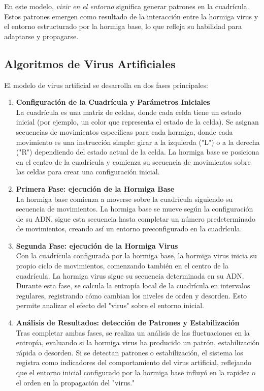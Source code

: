 \documentclass[11pt,letterpaper]{article}
\begin{document}
\begin{multicols}{2}
En este modelo, \textit{vivir en el entorno} significa generar patrones en la cuadrícula. Estos patrones emergen como resultado de la interacción entre la hormiga virus y el entorno estructurado por la hormiga base, lo que refleja su habilidad para adaptarse y propagarse.

\subsection{Algoritmos de Virus Artificiales}
El modelo de virus artificial se desarrolla en dos fases principales:

\begin{enumerate}
    \item \textbf{Configuración de la Cuadrícula y Parámetros Iniciales} \\
    La cuadrícula es una matriz de celdas, donde cada celda tiene un estado inicial (por ejemplo, un color que representa el estado de la celda). Se asignan secuencias de movimientos específicas para cada hormiga, donde cada movimiento es una instrucción simple: girar a la izquierda ("L") o a la derecha ("R") dependiendo del estado actual de la celda. La hormiga base se posiciona en el centro de la cuadrícula y comienza su secuencia de movimientos sobre las celdas para crear una configuración inicial.

    \item \textbf{Primera Fase: ejecución de la Hormiga Base} \\
    La hormiga base comienza a moverse sobre la cuadrícula siguiendo su secuencia de movimientos. La hormiga base se mueve según la configuración de su ADN, sigue esta secuencia hasta completar un número predeterminado de movimientos, creando así un entorno preconfigurado en la cuadrícula.

    \item \textbf{Segunda Fase: ejecución de la Hormiga Virus} \\
    Con la cuadrícula configurada por la hormiga base, la hormiga virus inicia su propio ciclo de movimientos, comenzando también en el centro de la cuadrícula. La hormiga virus sigue su secuencia determinada en su ADN. Durante esta fase, se calcula la entropía local de la cuadrícula en intervalos regulares, registrando cómo cambian los niveles de orden y desorden. Esto permite analizar el efecto del "virus" sobre el entorno inicial.

    \item \textbf{Análisis de Resultados: detección de Patrones y Estabilización} \\
    Tras completar ambas fases, se realiza un análisis de las fluctuaciones en la entropía, evaluando si la hormiga virus ha producido un patrón, estabilización rápida o desorden. Si se detectan patrones o estabilización, el sistema los registra como indicadores del comportamiento del virus artificial, reflejando que el entorno inicial configurado por la hormiga base influyó en la rapidez o el orden en la propagación del "virus."
\end{enumerate}


\end{multicols}
\end{document}

